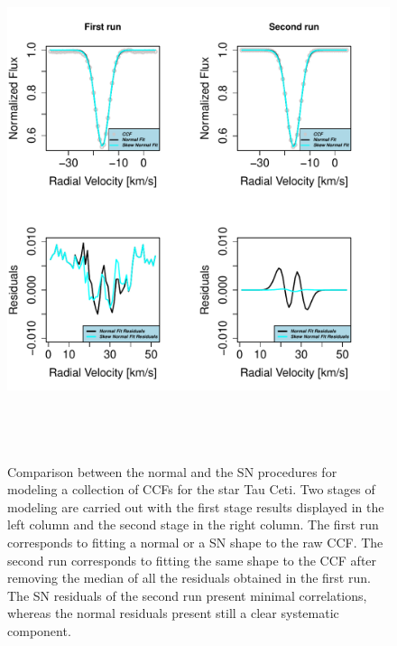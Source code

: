 \documentclass[11pt, oneside]{article}
\begin{document}
\begin{figure}[htbp]
   \centering
\includegraphics[height = 6in]{[1]Plot_Fitting_and_Residuals_2run.pdf} 
   \caption{Comparison between the normal and the SN procedures for modeling a collection of CCFs for the star Tau Ceti.  Two stages of modeling are carried out with the first stage results displayed in the left column and the second stage in the right column.
   The first run corresponds to fitting a normal or a SN shape to the raw CCF. The second run corresponds to fitting the same shape to the CCF after removing the median of all the residuals obtained in the first run. The SN residuals of the second run present minimal correlations, whereas the normal residuals present still a clear systematic component.}
   \label{fig:Residual.comparison}
\end{figure}
\end{document}
